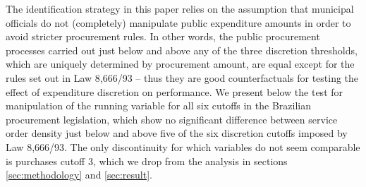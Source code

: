 \documentclass[11pt]{article}
\begin{document}
The identification strategy in this paper relies on the assumption that municipal officials do not (completely) manipulate public expenditure amounts in order to avoid stricter procurement rules. In other words, the public procurement processes carried out just below and above any of the three discretion thresholds, which are uniquely determined by procurement amount, are equal except for the rules set out in Law 8,666/93 -- thus they are good counterfactuals for testing the effect of expenditure discretion on performance. We present below the \citet{McCraryManipulationrunningvariable2008} test for manipulation of the running variable for all six cutoffs in the Brazilian procurement legislation, which show no significant difference between service order density just below and above five of the six discretion cutoffs imposed by Law 8,666/93. The only discontinuity for which variables do not seem comparable is purchases cutoff 3, which we drop from the analysis in sections \ref{sec:methodology} and \ref{sec:result}.
\end{document}
